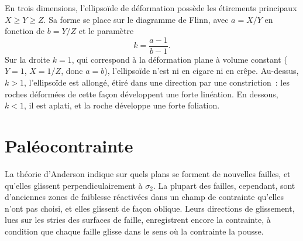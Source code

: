En trois dimensions, l'ellipsoïde de déformation possède les étirements principaux $X \ge Y
\ge Z$. Sa forme se place sur le diagramme de Flinn, avec $a = X/Y$ en fonction de $b =
Y/Z$ et le paramètre
\[
  k = \frac{a - 1}{b - 1} .
\]
Sur la droite $k = 1$, qui correspond à la déformation plane à volume constant ($Y = 1$,
$X = 1/Z$, donc $a = b$), l'ellipsoïde n'est ni en cigare ni en crêpe. Au-dessus,
$k > 1$, l'ellipsoïde est allongé, étiré dans une direction par une
constriction~: les roches déformées de cette façon développent une forte linéation. En dessous, $k < 1$,
il est aplati, et la roche développe une forte foliation.

\begin{omfigure}

\par{}\label{fig:b3:structural-analysis:flinn}
\end{omfigure}

\section{Paléocontrainte}\label{sec:b3:structural-analysis:palaeostress}

La théorie d'Anderson indique sur quels plans se forment de nouvelles failles, et qu'elles glissent
perpendiculairement à $\sigma_2$. La plupart des failles, cependant, sont d'anciennes zones de
faiblesse réactivées dans un champ de contrainte qu'elles n'ont pas choisi, et elles glissent
de façon oblique. Leurs directions de glissement, lues sur les stries des
surfaces de faille, enregistrent encore la contrainte, à condition que chaque faille glisse dans le sens où la
contrainte la pousse.

